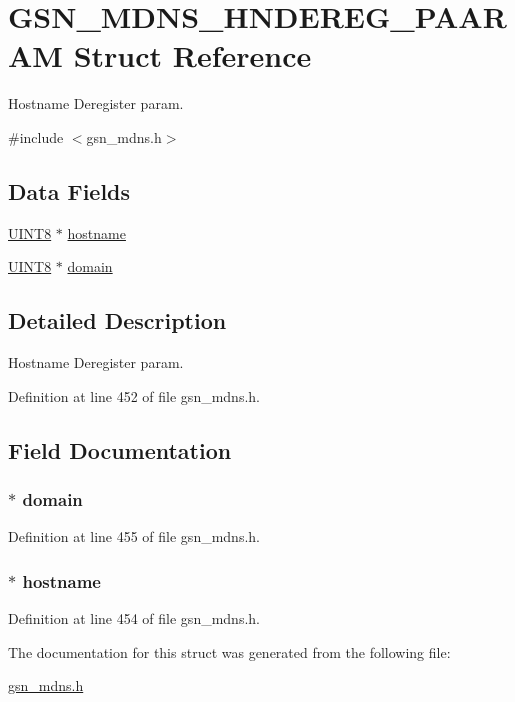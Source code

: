 \hypertarget{a00142}{
\section{GSN\_\-MDNS\_\-HNDEREG\_\-PAARAM Struct Reference}
\label{a00142}
}


Hostname Deregister param.  




{\ttfamily \#include $<$gsn\_\-mdns.h$>$}

\subsection*{Data Fields}
\begin{DoxyCompactItemize}
\item 
\hyperlink{a00660_gab27e9918b538ce9d8ca692479b375b6a}{UINT8} $\ast$ \hyperlink{a00142_a45121663692c76af31d59c96115adbd1}{hostname}
\item 
\hyperlink{a00660_gab27e9918b538ce9d8ca692479b375b6a}{UINT8} $\ast$ \hyperlink{a00142_a3498b70cb998dd924ec4aea5780b9696}{domain}
\end{DoxyCompactItemize}


\subsection{Detailed Description}
Hostname Deregister param. 

Definition at line 452 of file gsn\_\-mdns.h.



\subsection{Field Documentation}
\hypertarget{a00142_a3498b70cb998dd924ec4aea5780b9696}{
\subsubsection[{domain}]{$\ast$ {\bf domain}}}
\label{a00142_a3498b70cb998dd924ec4aea5780b9696}


Definition at line 455 of file gsn\_\-mdns.h.

\hypertarget{a00142_a45121663692c76af31d59c96115adbd1}{
\subsubsection[{hostname}]{$\ast$ {\bf hostname}}}
\label{a00142_a45121663692c76af31d59c96115adbd1}


Definition at line 454 of file gsn\_\-mdns.h.



The documentation for this struct was generated from the following file:\begin{DoxyCompactItemize}
\item 
\hyperlink{a00526}{gsn\_\-mdns.h}\end{DoxyCompactItemize}
